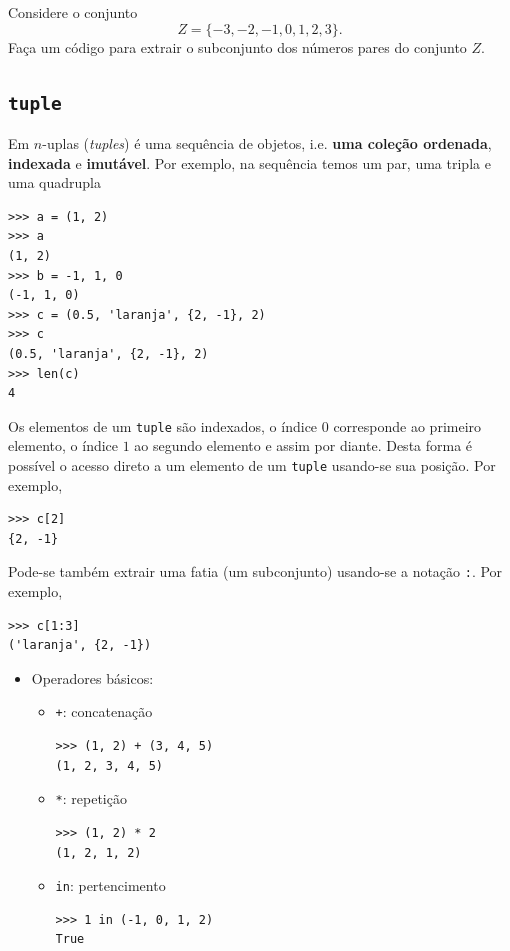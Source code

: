 \documentclass[12pt]{article}
\begin{document}
\begin{exr}
  Considere o conjunto
  \begin{equation}
    Z = \{-3, -2, -1, 0, 1, 2, 3\}.
  \end{equation}
  Faça um código {\python} para extrair o subconjunto dos números pares do conjunto $Z$.
\end{exr}

\subsection{\texttt{tuple}}

Em {\python} $n$-uplas ({\it tuples}) é uma sequência de objetos, i.e. {\bf uma coleção ordenada}, {\bf indexada} e {\bf imutável}. Por exemplo, na sequência temos um par, uma tripla e uma quadrupla

\begin{lstlisting}
>>> a = (1, 2)
>>> a
(1, 2)
>>> b = -1, 1, 0
(-1, 1, 0)
>>> c = (0.5, 'laranja', {2, -1}, 2)
>>> c
(0.5, 'laranja', {2, -1}, 2)
>>> len(c)
4
\end{lstlisting}

Os elementos de um \lstinline+tuple+ são indexados, o índice $0$ corresponde ao primeiro elemento, o índice $1$ ao segundo elemento e assim por diante. Desta forma é possível o acesso direto a um elemento de um \lstinline+tuple+ usando-se sua posição. Por exemplo,

\begin{lstlisting}
>>> c[2]
{2, -1}
\end{lstlisting}

Pode-se também extrair uma fatia (um subconjunto) usando-se a notação \lstinline+:+. Por exemplo,

\begin{lstlisting}
>>> c[1:3]
('laranja', {2, -1})
\end{lstlisting}

\begin{itemize}
\item Operadores básicos:

\begin{itemize}
  \item[] \lstinline-+-: concatenação

\begin{lstlisting}
>>> (1, 2) + (3, 4, 5)
(1, 2, 3, 4, 5)
\end{lstlisting}

    \item[] \lstinline+*+: repetição

\begin{lstlisting}
>>> (1, 2) * 2
(1, 2, 1, 2)
\end{lstlisting}

    \item[] \lstinline+in+: pertencimento

\begin{lstlisting}
>>> 1 in (-1, 0, 1, 2)
True
\end{lstlisting}

  \end{itemize}
\end{itemize}
\end{document}
